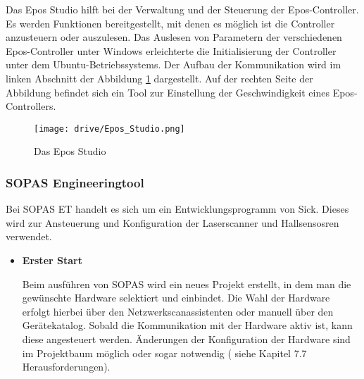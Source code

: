 Das Epos Studio hilft bei der Verwaltung und der Steuerung der Epos-Controller. Es werden Funktionen bereitgestellt, mit denen es möglich ist die Controller anzusteuern oder auszulesen. Das Auslesen von Parametern der verschiedenen Epos-Controller unter Windows erleichterte die Initialisierung der Controller unter dem Ubuntu-Betriebssystems. Der Aufbau der Kommunikation wird im linken Abschnitt der Abbildung \ref{fig:Epos} dargestellt. Auf der rechten Seite der Abbildung befindet sich ein Tool zur Einstellung der Geschwindigkeit eines Epos-Controllers.

\begin{figure}[h!]
 \centering
		\texttt{[image: drive/Epos\_Studio.png]}
	\caption{Das Epos Studio}
	\label{fig:Epos}
\end{figure}

\subsubsection{SOPAS Engineeringtool}

Bei SOPAS ET handelt es sich um ein Entwicklungsprogramm von Sick. Dieses wird zur Ansteuerung und Konfiguration der Laserscanner und Hallsensosren verwendet.

\begin{itemize}
\item \textbf{ Erster Start }

Beim ausführen von SOPAS wird ein neues Projekt erstellt, in dem man die gewünschte Hardware selektiert und einbindet. Die Wahl der Hardware erfolgt hierbei über den Netzwerkscanassistenten oder manuell über den Gerätekatalog. Sobald die Kommunikation mit der Hardware aktiv ist, kann diese angesteuert werden. Änderungen der Konfiguration der Hardware sind im Projektbaum möglich oder sogar notwendig ( siehe Kapitel 7.7 Herausforderungen).
\end{itemize}
